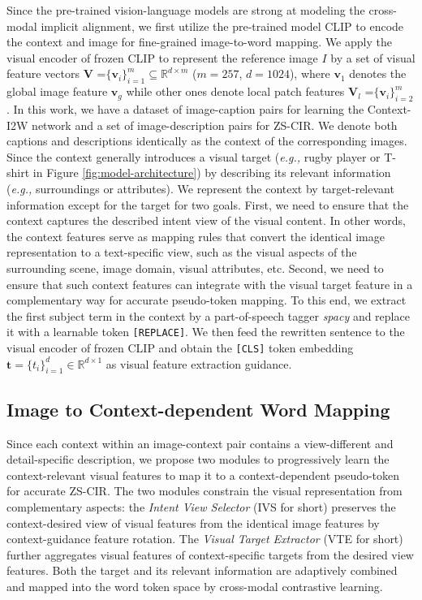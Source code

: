 \documentclass[letterpaper]{article} \usepackage{aaai24}  \usepackage{times}  \usepackage{helvet}  \usepackage{courier}  \usepackage[hyphens]{url}  \usepackage{graphicx} \urlstyle{rm} \def\UrlFont{\rm}  \usepackage{natbib}  \usepackage{caption} \frenchspacing  \setlength{\pdfpagewidth}{8.5in} \setlength{\pdfpageheight}{11in} \usepackage{algorithm}
\begin{document}
Since the pre-trained vision-language models are strong at modeling the cross-modal implicit alignment, we first utilize the pre-trained model CLIP to encode the context and image for fine-grained image-to-word mapping. We apply the visual encoder of frozen CLIP to represent the reference image $I$ by a set of visual feature vectors  $\boldsymbol{V}$ =$\{\boldsymbol{v}_i\}_{i=1}^m\subseteq{\mathbb{R}^{d\times{m}}}$ ($m=257$, $d=1024$), where $\boldsymbol{v}_1$ denotes the global image feature $\boldsymbol{v}_g$ while other ones denote local patch features $\boldsymbol{V}_l$ =$\{\boldsymbol{v}_{i}\}_{i=2}^m$. In this work, we have a dataset of image-caption pairs for learning the Context-I2W network and a set of image-description pairs for ZS-CIR. We denote both captions and descriptions identically as the context of the corresponding images. Since the context generally introduces a visual target (\textit{e.g.,} rugby player or T-shirt in Figure \ref{fig:model-architecture}) by describing its relevant information  (\textit{e.g.,} surroundings or attributes). We represent the context by target-relevant information except for the target for two goals. First, we need to ensure that the context captures the described intent view of the visual content. In other words, the context features serve as mapping rules that convert the identical image representation to a text-specific view, such as the visual aspects of the surrounding scene, image domain, visual attributes, etc. Second, we need to ensure that such context features can integrate with the visual target feature in a complementary way for accurate pseudo-token mapping. To this end, we extract the first subject term in the context by a part-of-speech tagger \textit{spacy} \cite{honnibal2020spacy} and replace it with a learnable token \texttt{[REPLACE]}. We then feed the rewritten sentence to the visual encoder of frozen CLIP and obtain the \texttt{[CLS]} token embedding $\boldsymbol{t}=\{{t_i}\}_{i=1}^d\in\mathbb{R}^{d\times{1}}$ as visual feature extraction guidance.   

\subsection{Image to Context-dependent Word Mapping}

Since each context  within an image-context pair contains a view-different and detail-specific description, we propose two modules to progressively learn the context-relevant visual features to map it to a context-dependent pseudo-token for accurate ZS-CIR. The two modules constrain the visual representation from complementary aspects: the \textit{Intent View Selector} (IVS for short) preserves the context-desired view of visual features from the identical image features by context-guidance feature rotation. The \textit{Visual Target Extractor}  (VTE for short) further aggregates visual features of context-specific targets from the desired view features. Both the target and its relevant information are adaptively combined and mapped into the word token space by cross-modal contrastive learning.   
\end{document}
